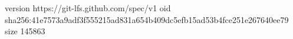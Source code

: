 version https://git-lfs.github.com/spec/v1
oid sha256:41e7573a9adf3f555215ad831a654b409dc5efb15ad53b4fce251e267640ee79
size 145863
